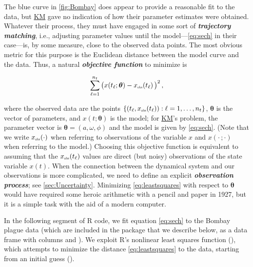 \documentclass[]{interact}\usepackage[]{graphicx}\usepackage[]{xcolor}
\theoremstyle{plain}%
\theoremstyle{definition}
\theoremstyle{remark}
\newcommand{\term}[1]{{\bfseries\slshape#1}}
\newcommand{\KM}{\protect\hyperlink{cite.KermMcKe27}{KM}\xspace}
\newcommand{\thetavec}{{\bm{\theta}}}
\newcommand{\code}[1]{\texttt{\detokenize{#1}}}
\newcommand{\KMcol}{blue\xspace}  %
\newcommand{\traj}{x}
\newcommand{\tindex}{{\ell}}
\newcommand{\ti}{t_\tindex}
\newcommand{\tindexmax}{{n_t}}
\newcommand{\trajobssymbol}{\traj_{{\rm{\color{black}\scalebox{0.5}{obs}}}}}
\newcommand{\trajobs}[1]{\trajobssymbol\!\left(#1\right)}
\newcommand{\trajobsti}{\trajobs{\ti}}
\begin{document}
The \KMcol curve in \cref{fig:Bombay} does appear to provide a
reasonable fit to the data, but \KM gave no
indication of how their parameter estimates were obtained.
Whatever their process, they must have engaged in some
sort of \term{trajectory matching}, i.e., adjusting parameter values
until the model---\cref{eq:sech} in their case---is, by some
measure, close to the observed data points.  The most obvious metric
for this purpose is the Euclidean distance between the model curve and
the data.  Thus, a natural \term{objective function} to
minimize is
\begin{linenomath*}
\begin{equation}\label{eq:leastsquares}
\sum_{\tindex=1}^{\tindexmax} \big(\traj(\ti;\thetavec) - \trajobsti\big)^2 \,,
\end{equation}
\end{linenomath*}
where the observed data are the points
$\{(\ti,\trajobsti):\tindex=1,\ldots,\tindexmax\}$, $\thetavec$ is the
vector of parameters, and $\traj(t;\thetavec)$ is the model; for \KM's
problem, the parameter vector is $\thetavec=(a,\omega,\phi)$ and the
model is given by \cref{eq:sech}.  (Note that we write $\trajobs{\cdot}$
when referring to observations of the variable $\traj$ and
$\traj(\cdot\,;\cdot)$ when referring to the model.)
Choosing this objective function is equivalent to assuming that the $\trajobsti$ values are direct (but noisy) observations of the state variable $\traj(t)$. When the connection between the dynamical system and our observations is more complicated, we need to define an explicit \term{observation process}; see \cref{sec:Uncertainty}.
Minimizing
\eqref{eq:leastsquares} with respect to $\thetavec$ would have
required some heroic arithmetic with a pencil and paper in 1927, but
it is a simple task with the aid of a modern computer.

In the following segment of R code, we fit equation \eqref{eq:sech} to
the Bombay plague data (which are included in the \code{fitode}
package that we describe below, as a data frame with columns
\code{week} and \code{mort}).  We exploit R's nonlinear least squares
function (\code{nls}), which attempts to minimize the distance
\eqref{eq:leastsquares} to the data, starting from an initial guess
(\code{start}).
\end{document}
